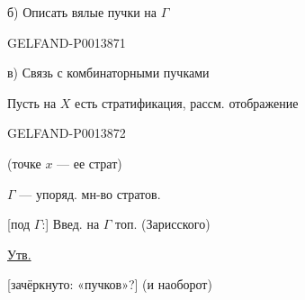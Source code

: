 б) Описать вялые пучки на \(\Gamma\)


\begin{GelfandAdjacentEvidence}{GELFAND-P001387}{1}

в) Связь с комбинаторными пучками

Пусть на \(X\) есть стратификация, рассм. отображение
\end{GelfandAdjacentEvidence}
\begin{GelfandAdjacentEvidence}{GELFAND-P001387}{2}

(точке \(x\) --- ее страт)

\(\Gamma\) --- упоряд. мн-во стратов.

[под \(\Gamma\):] Введ. на \(\Gamma\) топ. (Зарисского)

\uline{Утв.}

[зачёркнуто: «пучков»?]
(и наоборот)


\end{GelfandAdjacentEvidence}

